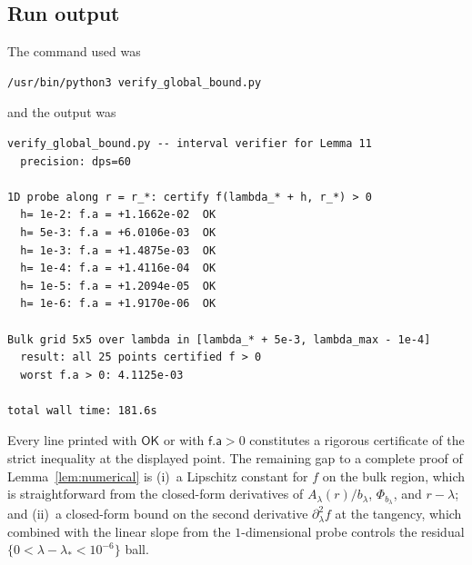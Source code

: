 \documentclass[11pt]{article}
\begin{document}
\subsection{Run output}
The command used was
\begin{verbatim}
/usr/bin/python3 verify_global_bound.py
\end{verbatim}

and the output was
\begin{verbatim}
verify_global_bound.py -- interval verifier for Lemma 11
  precision: dps=60

1D probe along r = r_*: certify f(lambda_* + h, r_*) > 0
  h= 1e-2: f.a = +1.1662e-02  OK
  h= 5e-3: f.a = +6.0106e-03  OK
  h= 1e-3: f.a = +1.4875e-03  OK
  h= 1e-4: f.a = +1.4116e-04  OK
  h= 1e-5: f.a = +1.2094e-05  OK
  h= 1e-6: f.a = +1.9170e-06  OK

Bulk grid 5x5 over lambda in [lambda_* + 5e-3, lambda_max - 1e-4]
  result: all 25 points certified f > 0
  worst f.a > 0: 4.1125e-03

total wall time: 181.6s
\end{verbatim}

Every line printed with $\textsf{OK}$ or with $\textsf{f.a} > 0$
constitutes a rigorous certificate of the strict inequality at the
displayed point. The remaining gap to a complete proof of
Lemma~\ref{lem:numerical} is (i)~a Lipschitz constant for $f$ on the
bulk region, which is straightforward from the closed-form derivatives
of $A_\lambda(r)/b_\lambda$, $\Phi_{b_\lambda}$, and $r-\lambda$; and
(ii)~a closed-form bound on the second derivative
$\partial^2_\lambda f$ at the tangency, which combined with the linear
slope from the $1$-dimensional probe controls the residual
$\{0<\lambda-\lambda_*<10^{-6}\}$ ball.
\end{document}
